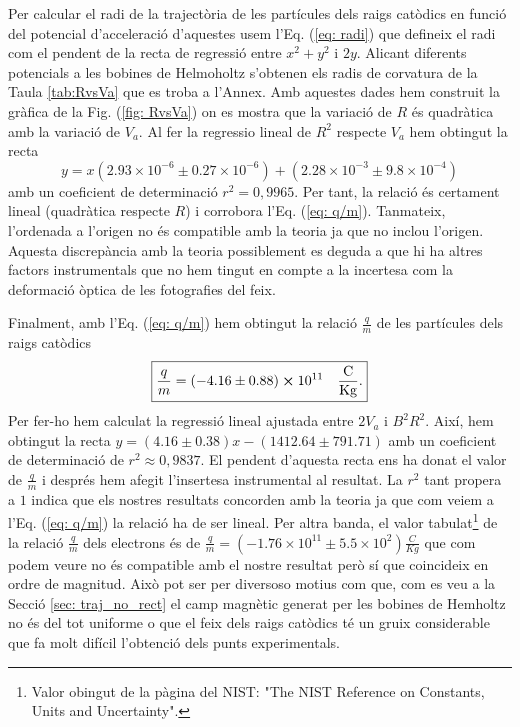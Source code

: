 \documentclass[11pt]{article}
\numberwithin{equation}{section}
\numberwithin{figure}{section}
\numberwithin{table}{section}
\begin{document}
Per calcular el radi de la trajectòria de les partícules dels raigs catòdics en funció del potencial d'acceleració d'aquestes usem l'Eq. (\ref{eq: radi}) que defineix el radi com el pendent de la recta de regressió entre $x^2+y^2$ i $2y$. Alicant diferents potencials a les bobines de Helmoholtz s'obtenen els radis de corvatura de la Taula \ref{tab:RvsVa} que es troba a l'Annex. Amb aquestes dades hem construit la gràfica de la Fig. (\ref{fig: RvsVa}) on es mostra que la variació de $R$ és quadràtica amb la variació de $V_a$. Al fer la regressio lineal de $R^2$ respecte $V_a$ hem obtingut la recta
\begin{equation}
    y=x(2.93\times10^{-6}\pm0.27\times10^{-6})+(2.28\times 10^{-3}\pm9.8\times10^{-4})
\end{equation}  
amb un coeficient de determinació $r^2=0,9965$. Per tant, la relació és certament lineal (quadràtica respecte $R$) i corrobora l'Eq. (\ref{eq: q/m}). Tanmateix, l'ordenada a l'origen no és compatible amb la teoria ja que no inclou l'origen. Aquesta discrepància amb la teoria possiblement es deguda a que hi ha altres factors instrumentals que no hem tingut en compte a la incertesa com la deformació òptica de les fotografies del feix.


Finalment, amb l'Eq. (\ref{eq: q/m}) hem obtingut la relació $\frac{q}{m}$ de les partícules dels raigs catòdics
\[
\boxed{\frac{q}{m}=(-4.16\pm0.88)\cross10^{11}\quad \mathrm{\frac{C}{Kg}.}}
\]
Per fer-ho hem calculat la regressió lineal ajustada entre $2V_a$ i $B^2R^2$. Així, hem obtingut la recta $y=(4.16\pm0.38)x - (1412.64\pm791.71)$ amb un coeficient de determinació de $r^2\approx0,9837$. El pendent d'aquesta recta ens ha donat el valor de $\frac{q}{m}$ i després hem afegit l'insertesa instrumental al resultat. La $r^2$ tant propera a $1$ indica que els nostres resultats concorden amb la teoria ja que com veiem a l'Eq. (\ref{eq: q/m}) la relació ha de ser lineal. 
Per altra banda, el valor tabulat\footnote{Valor obingut de la pàgina del NIST: "The NIST Reference on Constants, Units and Uncertainty".} de la relació $\frac{q}{m}$ dels electrons és de $\frac{q}{m}=(-1.76\times10^{11}\pm5.5\times10^{2}) \frac{C}{Kg}$ que    com podem veure no és compatible amb el nostre resultat però sí que coincideix en ordre de magnitud. Això pot ser per diversoso motius com que, com es veu a la Secció \ref{sec: traj_no_rect} el camp magnètic generat per les bobines de Hemholtz no és del tot uniforme o que el feix dels raigs catòdics té un gruix considerable que fa molt difícil l'obtenció dels punts experimentals.
\end{document}
